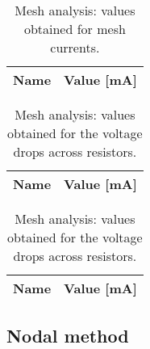 \begin{table}[h]
  \centering
  \begin{tabular}{|l|r|}
    \hline
    {\bf Name} & {\bf Value [mA]} \\ \hline
    
  \end{tabular}
  \caption{Mesh analysis: values obtained for mesh currents.}
  \label{tab:op1}
\end{table}

\begin{table}[h]
  \parbox{.45\linewidth}{
    \centering
    \begin{tabular}{|c|c|}
      \hline
      {\bf Name} & {\bf Value [mA]} \\ \hline
      
    \end{tabular}
    \caption{Mesh analysis: values obtained for the currents running through the resistors.}
  }
  \hfill
  \parbox{.45\linewidth}{
    \centering
    \begin{tabular}{|c|c|}
      \hline
      {\bf Name} & {\bf Value [mA]} \\ \hline
      
    \end{tabular}
    \caption{Mesh analysis: values obtained for the voltage drops across resistors.}
  }
\end{table}

\subsection{Nodal method}


